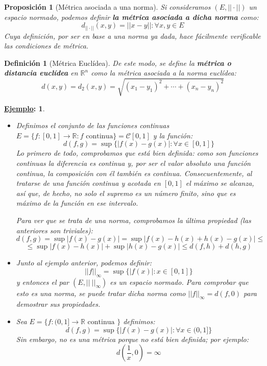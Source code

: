 \documentclass[10pt,a4paper,openright]{book}
\theoremstyle{break}
\newtheorem*{defi}{Definición}
\newtheorem*{prop}{Proposición}
\newtheorem*{ej}{\underline{Ejemplo}:}
\begin{document}
\begin{prop}[Métrica asociada a una norma]
Si consideramos $\left(E,||\cdot||\right)$ un espacio normado, podemos definir \textbf{la métrica asociada a dicha norma} como:
$$d_{||\cdot||}(x,y)=||x-y||: \forall x, y \in E$$
Cuya definición, por ser en base a una norma ya dada, hace fácilmente verificable las condiciones de métrica.
\end{prop}

\begin{defi}[Métrica Euclídea]
De este modo, se define la \textbf{métrica o distancia euclídea} en $\mathbb R^n$ como la métrica asociada a la norma euclídea:
$$d(x,y)=d_2(x,y)=\sqrt{(x_1-y_1)^2+\cdots + (x_n-y_n)^2}$$
\end{defi}

\begin{ej}
\begin{itemize}
\item Definimos el conjunto de las funciones continuas $E=\{f: [0,1]\rightarrow \mathbb R: f\mbox{ continua}\} = \mathcal C[0,1]$ y la función:
$$d(f,g) = \sup\{|f(x)-g(x)|: \forall x \in [0,1]\}$$
Lo primero de todo, comprobamos que está bien definida: como son funciones continuas la diferencia es continua y, por ser el valor absoluto una función continua, la composición con él también es continua. Consecuentemente, al tratarse de una función continua y acotada en $[0,1]$ el máximo se alcanza, así que, de hecho, no solo el supremo es un número finito, sino que es máximo de la función en ese intervalo.

Para ver que se trata de una norma, comprobamos la última propiedad (las anteriores son triviales):
$$d(f,g) = \sup|f(x) - g(x)| = \sup|f(x) - h(x) + h(x)- g(x)| \leq$$
$$\leq \sup|f(x) - h(x)| + \sup|h(x) - g(x)| \leq d(f,h) + d(h,g)$$

\item Junto al ejemplo anterior, podemos definir:
$$||f||_\infty = \sup\{|f(x)| : x \in [0,1]\}$$
y entonces el par $(E, || \ ||_\infty)$ es un espacio normado. Para comprobar que esto es una norma, se puede tratar dicha norma como $||f||_\infty = d(f,0)$ para demostrar sus propiedades.

\item Sea $E = \{f : (0,1] \rightarrow \mathbb{R} \mbox{ continua }\}$ definimos: 
$$d(f,g) = \sup\{|f(x) - g(x)| : \forall x \in (0,1]\}$$
Sin embargo, no es una métrica porque no está bien definida; por ejemplo:
$$d\left(\frac{1}{x}, 0\right) = \infty$$
\end{itemize}
\end{ej}
\end{document}
